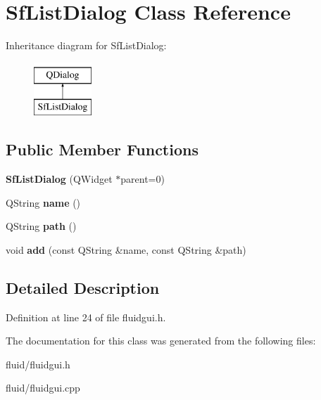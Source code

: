 \hypertarget{class_sf_list_dialog}{}\section{Sf\+List\+Dialog Class Reference}
\label{class_sf_list_dialog}
Inheritance diagram for Sf\+List\+Dialog\+:\begin{figure}[H]
\begin{center}
\leavevmode
\includegraphics[height=2.000000cm]{class_sf_list_dialog}
\end{center}
\end{figure}
\subsection*{Public Member Functions}
\begin{DoxyCompactItemize}
\item 
\mbox{\label{class_sf_list_dialog_a7bc87c2bb30217dfc87160c2fe0bde6b}} 
{\bfseries Sf\+List\+Dialog} (Q\+Widget $\ast$parent=0)
\item 
\mbox{\label{class_sf_list_dialog_a01a8bbdb9c55923510a1fbae7de7ef8b}} 
Q\+String {\bfseries name} ()
\item 
\mbox{\label{class_sf_list_dialog_aab1c47ae120db51518d2993f7e5351b0}} 
Q\+String {\bfseries path} ()
\item 
\mbox{\label{class_sf_list_dialog_a9ec380fe7caaaa11bc7534ba3d810b52}} 
void {\bfseries add} (const Q\+String \&name, const Q\+String \&path)
\end{DoxyCompactItemize}


\subsection{Detailed Description}


Definition at line 24 of file fluidgui.\+h.



The documentation for this class was generated from the following files\+:\begin{DoxyCompactItemize}
\item 
fluid/fluidgui.\+h\item 
fluid/fluidgui.\+cpp\end{DoxyCompactItemize}
